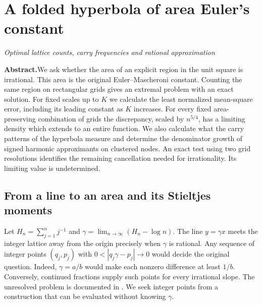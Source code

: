 \documentclass[11pt,a4paper,oneside,openany]{report}
\theoremstyle{remark}\newtheorem{remark}[theorem]{Remark}
\numberwithin{equation}{section}
\begin{document}
\chapter[The folded hyperbola]{A folded hyperbola of area Euler's constant}\label{chap:4}
{\noindent\large\itshape Optimal lattice counts, carry frequencies and rational approximation\par}\vspace{9pt}
\noindent\textbf{Abstract.}\enspace We ask whether the area of an explicit region in the unit square is irrational. This area is the original Euler--Mascheroni constant. Counting the same region on rectangular grids gives an extremal problem with an exact solution. For fixed scales up to $K$ we calculate the least normalized mean-square error, including its leading constant as $K$ increases. For every fixed area-preserving combination of grids the discrepancy, scaled by $n^{5/4}$, has a limiting density which extends to an entire function. We also calculate what the carry patterns of the hyperbola measure and determine the denominator growth of signed harmonic approximants on clustered nodes. An exact test using two grid resolutions identifies the remaining cancellation needed for irrationality. Its limiting value is undetermined.

\section{From a line to an area and its Stieltjes moments}\label{ch4:sec:area}
Let $H_n=\sum_{j=1}^n j^{-1}$ and $\gamma=\lim_{n\to\infty}(H_n-\log n)$. The line $y=\gamma x$ meets the integer lattice away from the origin precisely when $\gamma$ is rational. Any sequence of integer points $(q_j,p_j)$ with $0<|q_j\gamma-p_j|\to0$ would decide the original question. Indeed, $\gamma=a/b$ would make each nonzero difference at least $1/b$. Conversely, continued fractions supply such points for every irrational slope. The unresolved problem is documented in \cite{lagarias,sondow,kal}. We seek integer points from a construction that can be evaluated without knowing $\gamma$.
\end{document}

